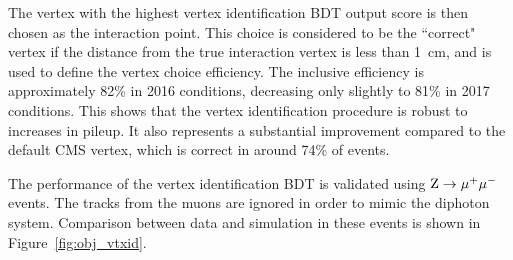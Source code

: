 The vertex with the highest vertex identification BDT output score is then chosen 
as the \Hgg interaction point.
This choice is considered to be the ``correct" vertex if the distance from the true interaction vertex
is less than \SI{1}{cm}, and is used to define the vertex choice efficiency.
The inclusive efficiency is approximately 82\% in 2016 conditions, %
decreasing only slightly to 81\% in 2017 conditions.
This shows that the vertex identification procedure is robust to increases in pileup.
It also represents a substantial improvement compared to the default CMS vertex, %
which is correct in around 74\% of events.

The performance of the vertex identification BDT is
validated using $\mathrm{Z}\rightarrow{\mu^{+}\mu^{-}}$ events.
The tracks from the muons are ignored in order to mimic the diphoton system.
Comparison between data and simulation in these events is shown in Figure~\ref{fig:obj_vtxid}.

